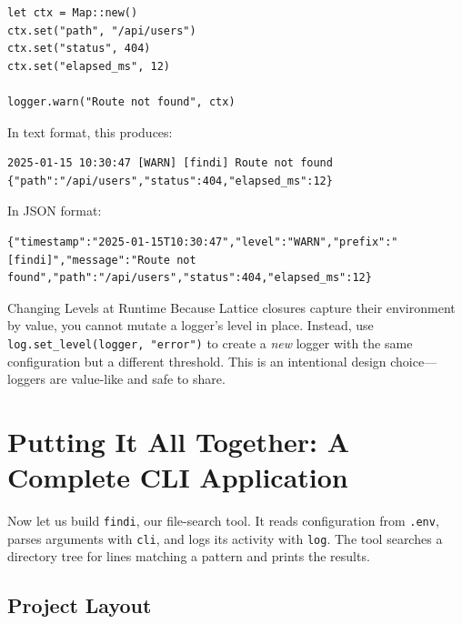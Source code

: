 \begin{lstlisting}[language=Lattice, caption={Logging with context}]
let ctx = Map::new()
ctx.set("path", "/api/users")
ctx.set("status", 404)
ctx.set("elapsed_ms", 12)

logger.warn("Route not found", ctx)
\end{lstlisting}

In text format, this produces:

\begin{lstlisting}[language={}, caption={Text log with context}]
2025-01-15 10:30:47 [WARN] [findi] Route not found {"path":"/api/users","status":404,"elapsed_ms":12}
\end{lstlisting}

In JSON format:

\begin{lstlisting}[language={}, caption={JSON log with context}]
{"timestamp":"2025-01-15T10:30:47","level":"WARN","prefix":"[findi]","message":"Route not found","path":"/api/users","status":404,"elapsed_ms":12}
\end{lstlisting}

\begin{tipbox}{Changing Levels at Runtime}
Because Lattice closures capture their environment by value, you cannot mutate a logger's level in place.
Instead, use \lstinline|log.set_level(logger, "error")| to create a \emph{new} logger with the same configuration but a different threshold.
This is an intentional design choice---loggers are value-like and safe to share.
\end{tipbox}

\section{Putting It All Together: A Complete CLI Application}\label{sec:cli-complete-app}


Now let us build \texttt{findi}, our file-search tool.
It reads configuration from \texttt{.env}, parses arguments with \lstinline|cli|, and logs its activity with \lstinline|log|.
The tool searches a directory tree for lines matching a pattern and prints the results.

\subsection{Project Layout}\label{sec:cli-project-layout}

